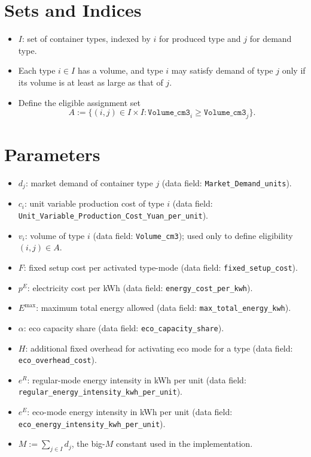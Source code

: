\section*{Sets and Indices}

\begin{itemize}
\item $I$: set of container types, indexed by $i$ for produced type and $j$ for demand type.
\item Each type $i \in I$ has a volume, and type $i$ may satisfy demand of type $j$ only if its volume is at least as large as that of $j$.
\item Define the eligible assignment set
\[
A := \{(i,j)\in I\times I : \texttt{Volume\_cm3}_i \ge \texttt{Volume\_cm3}_j\}.
\]
\end{itemize}

\section*{Parameters}

\begin{itemize}
\item $d_j$: market demand of container type $j$ (data field: \texttt{Market\_Demand\_units}).
\item $c_i$: unit variable production cost of type $i$ (data field: \texttt{Unit\_Variable\_Production\_Cost\_Yuan\_per\_unit}).
\item $v_i$: volume of type $i$ (data field: \texttt{Volume\_cm3}); used only to define eligibility $(i,j)\in A$.
\item $F$: fixed setup cost per activated type-mode (data field: \texttt{fixed\_setup\_cost}).
\item $p^E$: electricity cost per kWh (data field: \texttt{energy\_cost\_per\_kwh}).
\item $E^{\max}$: maximum total energy allowed (data field: \texttt{max\_total\_energy\_kwh}).
\item $\alpha$: eco capacity share (data field: \texttt{eco\_capacity\_share}).
\item $H$: additional fixed overhead for activating eco mode for a type (data field: \texttt{eco\_overhead\_cost}).
\item $e^R$: regular-mode energy intensity in kWh per unit (data field: \texttt{regular\_energy\_intensity\_kwh\_per\_unit}).
\item $e^E$: eco-mode energy intensity in kWh per unit (data field: \texttt{eco\_energy\_intensity\_kwh\_per\_unit}).
\item $M := \sum_{j\in I} d_j$, the big-$M$ constant used in the implementation.
\end{itemize}

